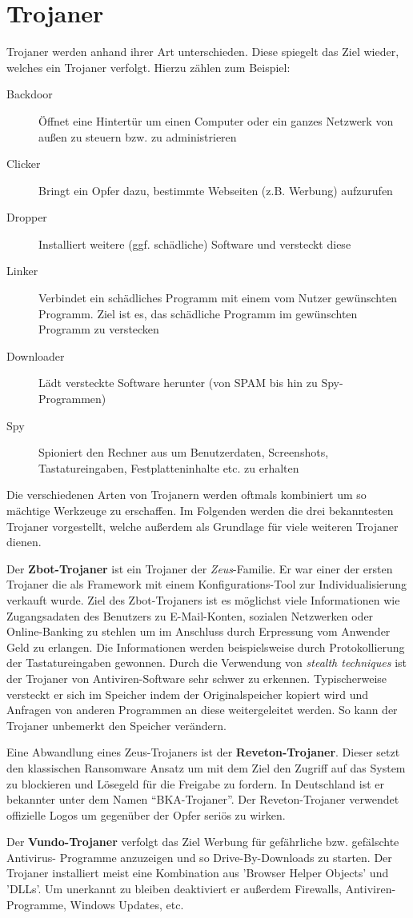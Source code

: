 \section{Trojaner}\label{sec:trojaner}
Trojaner werden anhand ihrer Art unterschieden.
Diese spiegelt das Ziel wieder, welches ein Trojaner verfolgt.
Hierzu zählen zum Beispiel:
\begin{description}
    \item[Backdoor] Öffnet eine Hintertür um einen Computer oder ein ganzes Netzwerk von außen zu steuern bzw. zu administrieren
    \item[Clicker] Bringt ein Opfer dazu, bestimmte Webseiten (z.B. Werbung) aufzurufen 
    \item[Dropper] Installiert weitere (ggf. schädliche) Software und versteckt diese
    \item[Linker] Verbindet ein schädliches Programm mit einem vom Nutzer gewünschten Programm. Ziel ist es, das schädliche Programm im gewünschten Programm zu verstecken
    \item[Downloader] Lädt versteckte Software herunter (von SPAM bis hin zu Spy-Programmen)
    \item[Spy] Spioniert den Rechner aus um Benutzerdaten, Screenshots, Tastatureingaben, Festplatteninhalte etc. zu erhalten
\end{description}
Die verschiedenen Arten von Trojanern werden oftmals kombiniert um so mächtige Werkzeuge zu erschaffen. 
Im Folgenden werden die drei bekanntesten Trojaner vorgestellt, welche außerdem als Grundlage für viele weiteren Trojaner dienen. 

Der \textbf{Zbot-Trojaner} ist ein Trojaner der \textit{Zeus}-Familie. Er war einer der ersten
Trojaner die als Framework mit einem Konfigurations-Tool zur Individualisierung verkauft wurde.
Ziel des Zbot-Trojaners ist es möglichst viele Informationen wie Zugangsadaten des Benutzers zu E-Mail-Konten, sozialen Netzwerken oder Online-Banking zu stehlen
um im Anschluss durch Erpressung vom Anwender Geld zu erlangen.
Die Informationen werden beispielsweise durch Protokollierung der Tastatureingaben gewonnen. 
Durch die Verwendung von \textit{stealth techniques} ist der Trojaner von Antiviren-Software sehr schwer zu erkennen.
Typischerweise versteckt er sich im Speicher indem der Originalspeicher kopiert wird und Anfragen von anderen Programmen
an diese weitergeleitet werden.
So kann der Trojaner unbemerkt den Speicher verändern.

Eine Abwandlung eines Zeus-Trojaners ist der \textbf{Reveton-Trojaner}.
Dieser setzt den klassischen Ransomware Ansatz um mit dem Ziel den Zugriff auf das System zu blockieren und Lösegeld für die Freigabe zu fordern.
In Deutschland ist er bekannter unter dem Namen \enquote{BKA-Trojaner}.
Der Reveton-Trojaner verwendet offizielle Logos um gegenüber der Opfer seriös zu wirken.

Der \textbf{Vundo-Trojaner} verfolgt das Ziel Werbung für gefährliche bzw. gefälschte Antivirus-
Programme anzuzeigen und so Drive-By-Downloads zu starten. Der Trojaner installiert
meist eine Kombination aus 'Browser Helper Objects' und 'DLLs'. Um unerkannt zu bleiben
deaktiviert er außerdem Firewalls, Antiviren-Programme, Windows Updates, etc. 
\cite{BEKTRO}